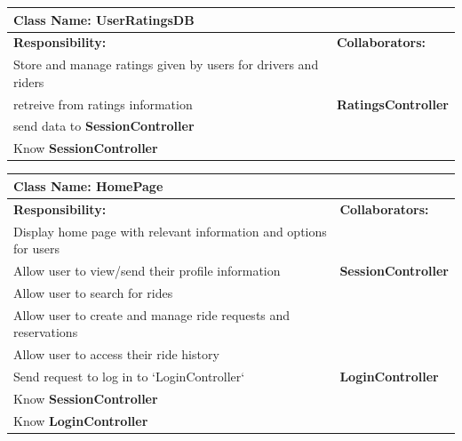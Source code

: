 \documentclass[]{article}
\begin{document}
\begin{table}[H]
    \centering
    \begin{tabular}{|p{5cm}|p{5cm}|}
    \hline 
     \multicolumn{2}{|l|}{\textbf{Class Name:} UserRatingsDB} \\
    \hline
    \textbf{Responsibility:} & \textbf{Collaborators:} \\
    \hline
    Store and manage ratings given by users for drivers and riders & \phantom{} \\
    \hline
    retreive from ratings information &  \textbf{RatingsController} \\
    \hline
    send data to \textbf{SessionController}\\
    \hline
     Know \textbf{SessionController} & \phantom{} \\
        \hline
    
    \end{tabular}
\end{table}

\begin{table}[H]
    \centering
    \begin{tabular}{|p{5cm}|p{5cm}|}
    \hline 
     \multicolumn{2}{|l|}{\textbf{Class Name:} HomePage} \\
    \hline
    \textbf{Responsibility:} & \textbf{Collaborators:} \\
    \hline
    Display home page with relevant information and options for users &  \phantom{} \\
    \hline
    Allow user to view/send their profile information & \textbf{SessionController} \\
    \hline
    Allow user to search for rides & \phantom{} \\
    \hline
    Allow user to create and manage ride requests and reservations & \phantom{} \\
    \hline
    Allow user to access their ride history & \phantom{} \\
    \hline
    Send request to log in to `LoginController` & \textbf{LoginController} \\
    \hline
    Know \textbf{SessionController}  & \phantom{} \\
    \hline
    Know \textbf{LoginController}  & \phantom{}\\
    \hline
    
    \end{tabular}
\end{table}
\end{document}
